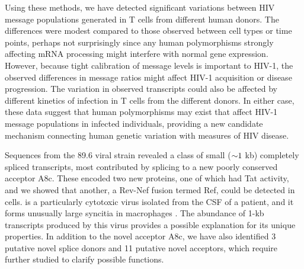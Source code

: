 \documentclass[../sherrill-Mix_thesis.tex]{subfiles}
\begin{document}
Using these methods, we have detected significant variations between HIV message populations generated in T cells from different human donors. The differences were modest compared to those observed between cell types or time points, perhaps not surprisingly since any human polymorphisms strongly affecting mRNA processing might interfere with normal gene expression. However, because tight calibration of message levels is important to HIV-1, the observed differences in message ratios might affect HIV-1 acquisition or disease progression. The variation in observed transcripts could also be affected by different kinetics of infection in T cells from the different donors. In either case, these data suggest that human polymorphisms may exist that affect HIV-1 message populations in infected individuals, providing a new candidate mechanism connecting human genetic variation with measures of HIV disease.

Sequences from the 89.6 viral strain revealed a class of small ($\mathord{\sim}{}1$ kb) completely spliced transcripts, most contributed by splicing to a new poorly conserved acceptor A8c. These encoded two new proteins, one of which had Tat activity, and we showed that another, a Rev-Nef fusion termed Ref, could be detected in cells. \hivEight{} is a particularly cytotoxic virus isolated from the CSF of a patient, and it forms unusually large syncitia in macrophages \citep{Collman1992}. The abundance of 1-kb transcripts produced by this virus provides a possible explanation for its unique properties. In addition to the novel acceptor A8c, we have also identified 3 putative novel splice donors and 11 putative novel acceptors, which require further studied to clarify possible functions.
\end{document}
